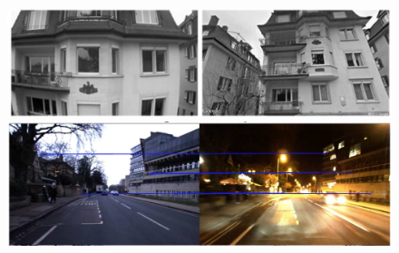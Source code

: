 \begin{figure}[t]
	\centering
    \begin{minipage}{0.44\linewidth}
    		\centering
   			\includegraphics[width=\linewidth]{changes/viewpoint.png}

			\includegraphics[width=\linewidth]{changes/daynight2.png}
			
    \end{minipage}
	\hfill
	\begin{minipage}{0.53\linewidth}
   		    

\end{minipage}
\end{figure}

